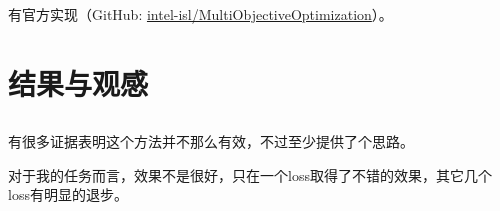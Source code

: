 \documentclass{ctexart}
\begin{document}
\subsubsection{}

有官方实现（GitHub: \href{https://github.com/intel-isl/MultiObjectiveOptimization}{intel-isl/MultiObjectiveOptimization}）。

\section{结果与观感}

\subsection{}

有很多证据表明这个方法并不那么有效，不过至少提供了个思路。

对于我的任务而言，效果不是很好，只在一个loss取得了不错的效果，其它几个loss有明显的退步。

\subsection{}

\subsection{}


\end{document}
